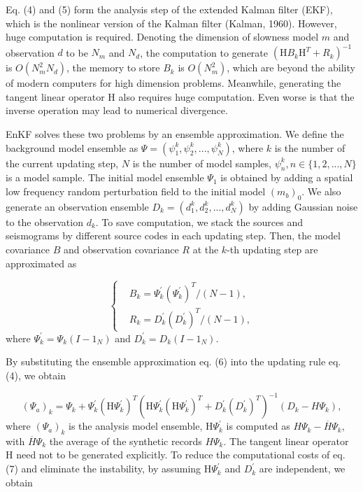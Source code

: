 \documentclass[mreferee]{gji}
\begin{document}
Eq. (4) and (5) form the analysis step of the extended Kalman filter (EKF), which is the nonlinear version of the Kalman filter (Kalman, 1960). However, huge computation is required. Denoting the dimension of slowness model $m$ and observation $d$ to be $N_m$ and $N_d$, the computation to generate $(\mbox{H}B_k\mbox{H}^T+R_k)^{-1}$ is $O(N_m^2N_d)$, the memory to store $B_k$ is $O(N_m^2)$, which are beyond the ability of modern computers for high dimension problems. Meanwhile, generating the tangent linear operator H also requires huge computation. Even worse is that the inverse operation may lead to numerical divergence.

EnKF solves these two problems by an ensemble approximation. We define the background model ensemble as $\Psi=(\psi_1^k,\psi_2^k,...,\psi_N^k)$, where $k$ is the number of the current updating step, $N$ is the number of model samples, $\psi_n^k, n\in\{1,2,...,N\}$ is a model sample. The initial model ensemble $\Psi_1$ is obtained by adding a spatial low frequency random perturbation field to the initial model $(m_b)_0$. We also generate an observation ensemble $D_k=(d_1^k,d_2^k,...,d_N^k)$ by adding Gaussian noise to the observation $d_k$. To save computation, we stack the sources and seismograms by different source codes in each updating step. Then, the model covariance $B$ and observation covariance $R$ at the $k$-th updating step are approximated as

\begin{equation}
\left\{
\begin{aligned}
& B_k=\Psi_k^{'}(\Psi_k^{'})^T/(N-1), \\
& R_k=D_k^{'}(D_k^{'})^T/(N-1),
\end{aligned}
\right.
\end{equation}
where $\Psi_k^{'}=\Psi_k(I-1_N)$ and $D_k^{'}=D_k(I-1_N)$.

By substituting the ensemble approximation eq. (6) into the updating rule eq. (4), we obtain

\begin{equation}
(\Psi_a)_k=\Psi_k+\Psi_k^{'}(\mbox{H}\Psi_k^{'})^T\left(\mbox{H}\Psi_k^{'}(\mbox{H}\Psi_k^{'})^T+D_k^{'}(D_k^{'})^T\right)^{-1}(D_k-H\Psi_k),
\end{equation}
where $(\Psi_a)_k$ is the analysis model ensemble, $\mbox{H}\Psi_k^{'}$ is computed as $H\Psi_k-\overline H\Psi_k$, with $\overline H\Psi_k$ the average of the synthetic records $H\Psi_k$. The tangent linear operator H need not to be generated explicitly. To reduce the computational costs of eq. (7) and eliminate the instability, by assuming $\mbox{H}\Psi_k^{'}$ and $D_k^{'}$ are independent, we obtain
\end{document}

